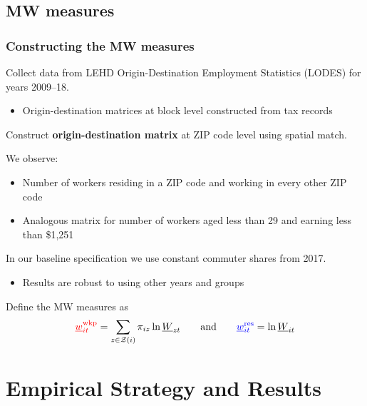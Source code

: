 \documentclass[aspectratio=169, t]{beamer}
\newcommand{\Z}{\mathcal{Z}}
\newcommand{\MW}{\underline{W}}
\newcommand{\mw}{\underline{w}}
\newcommand{\wkp}{\text{wkp}}
\newcommand{\res}{\text{res}}
\begin{document}
\subsection{MW measures}

\begin{frame}
    \frametitle{Constructing the MW measures}
        
    Collect data from LEHD Origin-Destination Employment Statistics (LODES) for years 2009--18.
    \begin{itemize}
        \item Origin-destination matrices at block level constructed from tax records
    \end{itemize}

    \vspace{1mm}
    Construct \textbf{origin-destination matrix} at ZIP code level using spatial match.
    
    \pause
    \vspace{2mm}
    We observe:
    \begin{itemize} \small
        \item Number of workers residing in a ZIP code and working in every other ZIP code
        \item Analogous matrix for number of workers aged less than 29 and earning less than 
        \$1,251
    \end{itemize}
    
    \vspace{1mm}
    In our baseline specification we use constant commuter shares from 2017.
    \begin{itemize} \small
        \item Results are robust to using other years and groups
    \end{itemize}

    \pause
    \vspace{4mm}
    Define the MW measures as
    $$
    {\color{red} \mw^{\wkp}_{it}} = \sum_{z \in \Z(i)} \pi_{i z} \ln \MW_{zt}
    \quad\quad\text{and}\quad\quad
    {\color{blue} \mw^{\res}_{it}} = \ln \MW_{it}
    $$
\end{frame}

\section{Empirical Strategy and Results}
\end{document}
